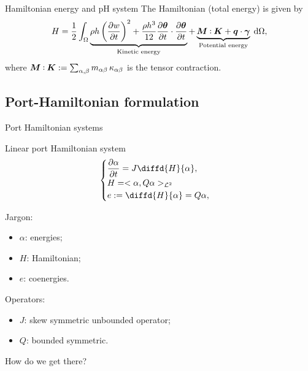 \documentclass{beamer}
\def\onedot{$\mathsurround0pt\ldotp$}
\def\cddot{%
	\mathbin{\vcenter{\baselineskip.67ex
			\hbox{\onedot}\hbox{\onedot}}%
}}
\begin{document}
\begin{frame}{Hamiltonian energy and pH system}
The Hamiltonian (total energy)  is given by
\begin{equation*} 
H =  \frac{1}{2} \int_{\Omega}\underbrace{ \rho h \left(\diffp{w}{t} \right)^2 +  \frac{\rho h^3}{12} \diffp{\bm{\theta}}{t} \cdot \diffp{\bm{\theta}}{t}  }_{\text{Kinetic energy}} + \underbrace{ \bm{M} \cddot \bm{K} + \bm{q} \cdot \bm{\gamma}}_{\text{Potential energy}}  \d\Omega,
\end{equation*}
where $\bm{M} \cddot \bm{K} := \sum_{\alpha, \beta} m_{\alpha \beta} \, \kappa_{\alpha \beta}$ is the tensor contraction. 
\end{frame}


\subsection{Port-Hamiltonian formulation}

\begin{frame}{Port Hamiltonian systems}
\begin{block}{Linear port Hamiltonian system}
\begin{equation*}
\begin{cases}
\displaystyle\diffp{\alpha}{t} = J \displaystyle\diffd{H}{\alpha},\\
H = <\alpha, Q \alpha>_{\mathcal{L}^2} \\
e := \displaystyle\diffd{H}{\alpha} =  Q \alpha,\\
\end{cases} 
\end{equation*}
\end{block}
Jargon:
\begin{itemize}
\item $\alpha$: {energies};\\
\item $H$: {Hamiltonian}; \\
\item $e$: {coenergies}. \\
\end{itemize}
Operators:
\begin{itemize}
\item $J$: {skew symmetric unbounded operator}; \\
\item $Q$: {bounded symmetric}. \\
\end{itemize}


\vspace{.5cm}
How do we get there?
\end{frame}
\end{document}
